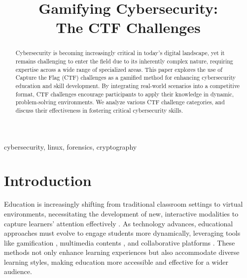 \documentclass[conference]{IEEEtran}
\begin{document}
\title{Gamifying Cybersecurity:\\The CTF Challenges}

\author{
\and
{}
}

\maketitle

\begin{abstract}
Cybersecurity is becoming increasingly critical in today's digital landscape,
  yet it remains challenging to enter the field due to its inherently complex
  nature, requiring expertise across a wide range of specialized areas. This
  paper explores the use of Capture the Flag (CTF) challenges as a gamified
  method for enhancing cybersecurity education and skill development. By
  integrating real-world scenarios into a competitive format, CTF challenges
  encourage participants to apply their knowledge in dynamic, problem-solving
  environments. We analyze various CTF challenge categories, and discuss their
  effectiveness in fostering critical cybersecurity skills.
\end{abstract}

\begin{IEEEkeywords}
cybersecurity, linux, forensics, cryptography
\end{IEEEkeywords}

\section{Introduction}

Education is increasingly shifting from traditional classroom settings to
virtual environments, necessitating the development of new, interactive
modalities to capture learners' attention effectively \cite{kumar2002}.
As technology advances,
educational approaches must evolve to engage students more dynamically,
leveraging tools like gamification \cite{brull2016}, multimedia contents
\cite{nazir2012}, and collaborative platforms \cite{diaz2019}.
These methods not only enhance learning experiences but also
accommodate diverse learning styles, making education more accessible and
effective for a wider audience.
\end{document}
